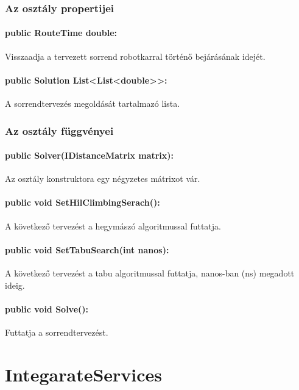 \subsubsection*{Az osztály propertijei}

\paragraph{public RouteTime double:}

Visszaadja a tervezett sorrend robotkarral történő bejárásának idejét. 

\paragraph{public  Solution List<List<double>>:}

A sorrendtervezés megoldását tartalmazó lista.

\subsubsection*{Az osztály függvényei}
\paragraph{public Solver(IDistanceMatrix matrix):}

Az osztály konstruktora egy négyzetes mátrixot vár.

\paragraph{public void SetHilClimbingSerach():}

A következő tervezést a hegymászó algoritmussal futtatja. 

\paragraph{public void SetTabuSearch(int nanos):}

A következő tervezést a tabu algoritmussal futtatja, nanos-ban (ns) megadott ideig.

\paragraph{public void Solve():}

Futtatja a sorrendtervezést.

\section{IntegarateServices}

